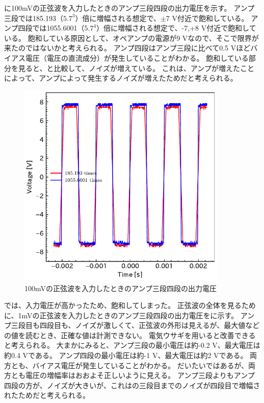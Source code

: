 \documentclass[report.tex]{subfiles}
\begin{document}
に100mVの正弦波を入力したときのアンプ三段四段の出力電圧を示す。
アンプ三段では185.193（\(5.7^3\)）倍に増幅される想定で、\(\pm\)7 V付近で飽和している。
アンプ四段では1055.6001（\(5.7^4\)）倍に増幅される想定で、-7,+8 V付近で飽和している。
飽和している原因として、オペアンプの電源が9 Vなので、そこで限界が来たのではないかと考えられる。
アンプ四段はアンプ三段に比べて0.5 Vほどバイアス電圧（電圧の直流成分）が発生していることがわかる。
飽和している部分を見ると、と比較して、ノイズが増えている。
これは、アンプが増えたことによって、アンプによって発生するノイズが増えたためだと考えられる。

\begin{figure}[H]
	\centering
	\includegraphics[width=10cm]{fig/level34_100m.pdf}
	\caption{100mVの正弦波を入力したときのアンプ三段四段の出力電圧}
	\label{fig:34_100m}
\end{figure}

では、入力電圧が高かったため、飽和してしまった。
正弦波の全体を見るために、1mVの正弦波を入力したときのアンプ三段四段の出力電圧をに示す。
アンプ三段目も四段目も、ノイズが激しくて、正弦波の外形は見えるが、最大値などの値を読むとき、正確な値は計測できない。
電気ウサギを用いると改善できると考えられる。
大まかにみると、アンプ三段の最小電圧は約-0.2 V、最大電圧は約0.4 Vである。
アンプ四段の最小電圧は約-1 V、最大電圧は約2 Vである。
両方とも、バイアス電圧が発生していることがわかる。
だいたいではあるが、両方とも電圧の増幅率はおおよそ正しいように見える。
アンプ三段よりもアンプ四段の方が、ノイズが大きいが、これはの三段目までのノイズが四段目で増幅されたためだと考えられる。
\end{document}
